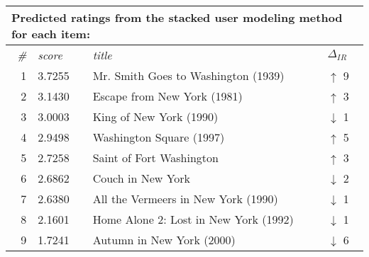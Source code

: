 \begin{table}[h]
  \begin{tabular*}{0.9\textwidth}{ r l p{8.5cm} l }
    \multicolumn{4}{l}{Predicted ratings from the stacked user modeling method for each item:}\\
    \toprule
    \emph{\#} & \emph{score} & \emph{title} & $\Delta_{IR}$\\
    \midrule
    1 & 3.7255  &  Mr. Smith Goes to Washington (1939)    & \color{green} $\uparrow$ 9 \\
    2 & 3.1430  &  Escape from New York (1981)            & \color{green} $\uparrow$ 3 \\
    3 & 3.0003  &  King of New York (1990)                & \color{red} $\downarrow$ 1 \\
    4 & 2.9498  &  Washington Square (1997)               & \color{green} $\uparrow$ 5 \\
    5 & 2.7258  &  Saint of Fort Washington               & \color{green} $\uparrow$ 3 \\
    6 & 2.6862  &  Couch in New York                      & \color{red} $\downarrow$ 2 \\
    7 & 2.6380  &  All the Vermeers in New York (1990)    & \color{red} $\downarrow$ 1 \\
    8 & 2.1601  &  Home Alone 2: Lost in New York (1992)  & \color{red} $\downarrow$ 1 \\
    9 & 1.7241  &  Autumn in New York (2000)              & \color{red} $\downarrow$ 6 \\
    \bottomrule
  \end{tabular*}

  \vspace{1em} 


\end{table}
